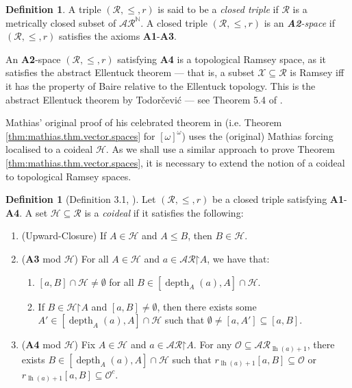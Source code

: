\documentclass[10pt,a4paper]{amsart}
\theoremstyle{plain}
\numberwithin{equation}{section}
\theoremstyle{definition}
\newtheorem{definition}[theorem]{Definition}
\newcommand{\func}{\operatorname}
\newcommand{\N}{\mathbb{N}}
\newcommand{\cal}{\mathcal}
\newcommand{\restrictedto}{\mathord{\upharpoonright}}
\newcommand{\X}{\cal{X}}
\renewcommand{\H}{\cal{H}}
\newcommand{\lh}{\func{lh}}
\renewcommand{\O}{\cal{O}}
\newcommand{\depth}{\func{depth}}
\begin{document}
\begin{definition}
    A triple $(\cal{R},\leq,r)$ is said to be a \emph{closed triple} if $\cal{R}$ is a metrically closed subset of $\cal{AR}^\N$. A closed triple $(\cal{R},\leq,r)$ is an \emph{\textbf{A2}-space} if $(\cal{R},\leq,r)$ satisfies the axioms \textbf{A1}-\textbf{A3}.
\end{definition}

An \textbf{A2}-space $(\cal{R},\leq,r)$ satisfying \textbf{A4} is a topological Ramsey space, as it satisfies the abstract Ellentuck theorem --- that is, a subset $\X \subseteq \cal{R}$ is Ramsey iff it has the property of Baire relative to the Ellentuck topology. This is the abstract Ellentuck theorem by Todor\v{c}evi\'{c} --- see Theorem 5.4 of \cite{T10}.

Mathias' original proof of his celebrated theorem in \cite{M77} (i.e. Theorem \ref{thm:mathias.thm.vector.spaces} for $[\omega]^\omega$) uses the (original) Mathias forcing localised to a coideal $\H$. As we shall use a similar approach to prove Theorem \ref{thm:mathias.thm.vector.spaces}, it is necessary to extend the notion of a coideal to topological Ramsey spaces. 

\begin{definition}[Definition 3.1, \cite{DMN15}]
\label{def:coideal}
    Let $(\cal{R},\leq,r)$ be a closed triple satisfying \textbf{A1}-\textbf{A4}. A set $\H \subseteq \cal{R}$ is a \emph{coideal} if it satisfies the following:
    \begin{enumerate}
        \item (Upward-Closure) If $A \in \H$ and $A \leq B$, then $B \in \H$.
        
        \item (\textbf{A3} mod $\H$) For all $A \in \H$ and $a \in \cal{AR}\restrictedto A$, we have that:
        \begin{enumerate}
            \item $[a,B] \cap \H \neq \emptyset$ for all $B \in [\depth_A(a),A] \cap \H$.
            
            \item If $B \in \H \restrictedto A$ and $[a,B] \neq \emptyset$, then there exists some $A' \in [\depth_A(a),A] \cap \H$ such that $\emptyset \neq [a,A'] \subseteq [a,B]$.
        \end{enumerate}
        
        \item (\textbf{A4} mod $\H$) Fix $A \in \H$ and $a \in \cal{AR} \restrictedto A$. For any $\O \subseteq \cal{AR}_{\lh(a)+1}$, there exists $B \in [\depth_A(a),A] \cap \H$ such that $r_{\lh(a)+1}[a,B] \subseteq \O$ or $r_{\lh(a)+1}[a,B] \subseteq \O^c$.
    \end{enumerate}
\end{definition}
\end{document}

